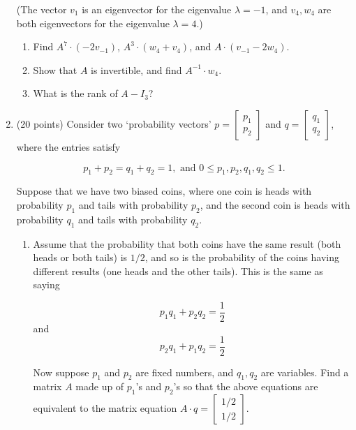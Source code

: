 \documentclass[12 pt]{report}
\begin{document}
\begin{enumerate}
(The vector $v_1$ is an eigenvector for the eigenvalue $\lambda = -1$, and $v_4, w_4$ are both eigenvectors for the eigenvalue $\lambda = 4$.)

\begin{enumerate} \item Find $A^7 \cdot (-2 v_{-1})$, $A^3 \cdot (w_4+v_4)$, and $A\cdot(v_{-1}-2w_4).$ 

\vfill

\item Show that $A$ is invertible, and find $A^{-1}\cdot w_4. $

\vfill

\item What is the rank of $A - I_3$?
\vspace{4cm}
\end{enumerate}

\newpage 

\item(20 points) Consider two `probability vectors' $p = \begin{bmatrix} p_1 \\ p_2 \end{bmatrix}$ and $q = \begin{bmatrix} q_1 \\ q_2 \end{bmatrix}$, where the entries satisfy

\[
p_1+p_2 = q_1+q_2 = 1, \text{ and } 0 \leq p_1, p_2, q_1, q_2 \leq 1.
\]

Suppose that we have two biased coins, where one coin is heads with probability $p_1$ and tails with probability $p_2$, and the second coin is heads with probability $q_1$ and tails with probability $q_2$. 

\begin{enumerate} \item Assume that the probability that both coins have the same result (both heads or both tails) is $1/2$, and so is the probability of the coins having different results (one heads and the other tails). This is the same as saying 

\[
p_1 q_1 + p_2 q_2 = \frac{1}{2}
\]
and
\[
p_2 q_1 + p_1 q_2 = \frac{1}{2}
\]

Now suppose $p_1$ and $p_2$ are fixed numbers, and $q_1, q_2$ are variables. Find a matrix $A$ made up of $p_1$'s and $p_2$'s so that the above equations are equivalent to the matrix equation $A \cdot q = \begin{bmatrix} 1/2 \\ 1/2 \end{bmatrix}.$ 


\end{enumerate}
\end{enumerate}
\end{document}
